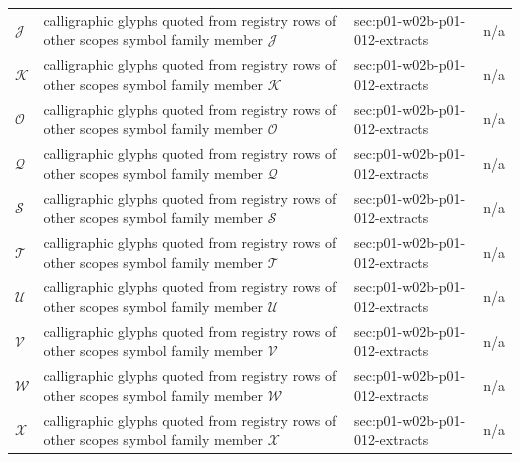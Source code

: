 \begin{longtable}{@{}p{}p{}p{}p{}@{}}
\(\mathcal J\) & calligraphic glyphs quoted from registry rows of other scopes symbol family member \(\mathcal J\) & sec:\allowbreak{}p01-\allowbreak{}w02b-\allowbreak{}p01-\allowbreak{}012-\allowbreak{}extracts & n/a \\
\(\mathcal K\) & calligraphic glyphs quoted from registry rows of other scopes symbol family member \(\mathcal K\) & sec:\allowbreak{}p01-\allowbreak{}w02b-\allowbreak{}p01-\allowbreak{}012-\allowbreak{}extracts & n/a \\
\(\mathcal O\) & calligraphic glyphs quoted from registry rows of other scopes symbol family member \(\mathcal O\) & sec:\allowbreak{}p01-\allowbreak{}w02b-\allowbreak{}p01-\allowbreak{}012-\allowbreak{}extracts & n/a \\
\(\mathcal Q\) & calligraphic glyphs quoted from registry rows of other scopes symbol family member \(\mathcal Q\) & sec:\allowbreak{}p01-\allowbreak{}w02b-\allowbreak{}p01-\allowbreak{}012-\allowbreak{}extracts & n/a \\
\(\mathcal S\) & calligraphic glyphs quoted from registry rows of other scopes symbol family member \(\mathcal S\) & sec:\allowbreak{}p01-\allowbreak{}w02b-\allowbreak{}p01-\allowbreak{}012-\allowbreak{}extracts & n/a \\
\(\mathcal T\) & calligraphic glyphs quoted from registry rows of other scopes symbol family member \(\mathcal T\) & sec:\allowbreak{}p01-\allowbreak{}w02b-\allowbreak{}p01-\allowbreak{}012-\allowbreak{}extracts & n/a \\
\(\mathcal U\) & calligraphic glyphs quoted from registry rows of other scopes symbol family member \(\mathcal U\) & sec:\allowbreak{}p01-\allowbreak{}w02b-\allowbreak{}p01-\allowbreak{}012-\allowbreak{}extracts & n/a \\
\(\mathcal V\) & calligraphic glyphs quoted from registry rows of other scopes symbol family member \(\mathcal V\) & sec:\allowbreak{}p01-\allowbreak{}w02b-\allowbreak{}p01-\allowbreak{}012-\allowbreak{}extracts & n/a \\
\(\mathcal W\) & calligraphic glyphs quoted from registry rows of other scopes symbol family member \(\mathcal W\) & sec:\allowbreak{}p01-\allowbreak{}w02b-\allowbreak{}p01-\allowbreak{}012-\allowbreak{}extracts & n/a \\
\(\mathcal X\) & calligraphic glyphs quoted from registry rows of other scopes symbol family member \(\mathcal X\) & sec:\allowbreak{}p01-\allowbreak{}w02b-\allowbreak{}p01-\allowbreak{}012-\allowbreak{}extracts & n/a \\

\end{longtable}

